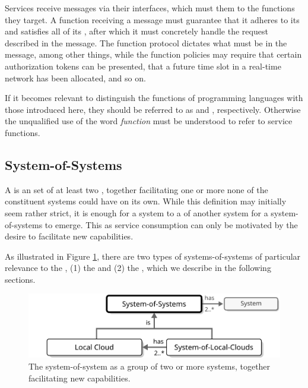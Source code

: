 Services receive messages via their interfaces, which must  them to the functions they target.
A function receiving a message must guarantee that it adheres to its  and satisfies all of its , after which it must concretely handle the request described in the message.
The function protocol dictates what  must be in the message, among other things, while the function policies may require that certain authorization tokens can be presented, that a future time slot in a real-time network has been allocated, and so on.

If it becomes relevant to distinguish the functions of programming languages with those introduced here, they should be referred to as  and , respectively.
Otherwise the unqualified use of the word \textit{function} must be understood to refer to service functions.

\subsection{System-of-Systems}
\label{sec:reference-model:system-of-systems}

A  is an  set of at least two , together facilitating one or more  none of the constituent systems could have on its own.
While this definition may initially seem rather strict, it is enough for a system to  a  of another system for a system-of-systems to emerge.
This as service consumption can only be motivated by the desire to facilitate new capabilities.

As illustrated in Figure \ref{fig:system-of-systems}, there are two types of systems-of-systems of particular relevance to the , (1) the  and (2) the , which we describe in the following sections.

\begin{figure}[ht!]
  \centering
  \includegraphics[scale=0.9]{figures/system-of-systems}
  \caption{
    The system-of-system as a group of two or more systems, together facilitating new capabilities.
  }
  \label{fig:system-of-systems}
  \vspace*{-3mm}
\end{figure}

